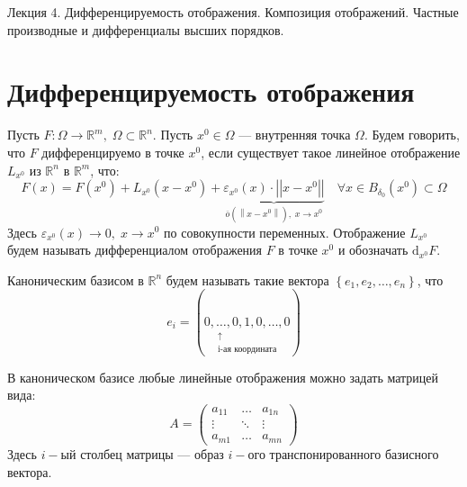 \documentclass[11pt]{article}
\begin{document}
\begin{titlepage}
    \centering
    \vspace*{\fill}  %

    {\Huge Лекция 4. Дифференцируемость отображения. Композиция отображений. 
    Частные производные и дифференциалы высших порядков.
    \par}

    \vspace*{\fill}  %
\end{titlepage}

\setcounter{page}{1}

\section{Дифференцируемость отображения}

\begin{definition}
    Пусть $F \colon \Omega \to \mathbb{R}^m, \; \Omega \subset \mathbb{R}^n$. Пусть 
    $x^0 \in \Omega$ --- внутренняя точка $\Omega$. Будем говорить, что $F$ дифференцируемо 
    в точке $x^0$, если существует такое линейное отображение $L_{x^0}$ из $\mathbb{R}^n$
    в $\mathbb{R}^m$, что:    
    \[F(x) = F\left(x^0\right) + L_{x^0}\left(x - x^0\right) + \underbrace{\varepsilon_{x^0}(x) \cdot \left|\left|x - x^0\right|\right|}_{\overline{o} \left(\left\lVert x - x^0 \right\rVert \right), \; x \to x^0} \quad \forall x \in B_{\delta_0}\left(x^0\right) \subset \Omega\]
    Здесь $\varepsilon_{x^0}(x) \to 0, \; x \to x^0$ по совокупности переменных.
    Отображение $L_{x^0}$ будем называть дифференциалом отображения $F$ в точке 
    $x^0$ и обозначать $\mathrm d_{x^0}F$.
\end{definition}

\begin{definition}
    Каноническим базисом в $\mathbb{R}^n$ будем называть такие вектора $ \left\{ e_1, e_2, \dots, e_n \right\} $,
    что \[e_i = ( \underset{\substack{\uparrow\\\text{i-ая координата}}}{0, \dots, 0, 1, 0, \dots, 0} )\]
\end{definition}

\begin{remark}
    В каноническом базисе любые линейные отображения можно задать матрицей вида:
    \[ A = \begin{pmatrix}
            a_{11} & \dots & a_{1n} \\ 
            \vdots & \ddots & \vdots \\ 
            a_{m1} & \dots & a_{mn} 
    \end{pmatrix} \]
    Здесь $i-$ый столбец матрицы --- образ $i-$ого транспонированного базисного вектора.
\end{remark}
\end{document}
